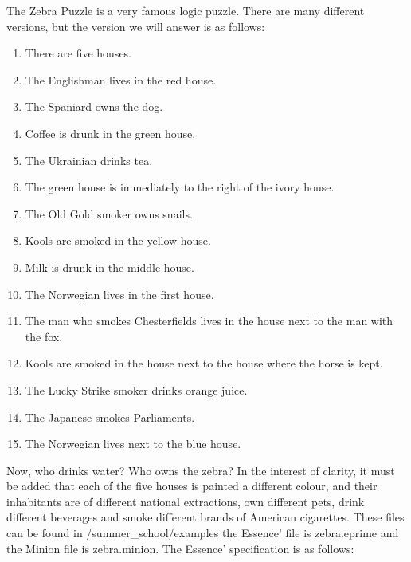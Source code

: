 \documentclass[oneside]{book}
\begin{document}
The Zebra Puzzle is a very famous logic puzzle. There are many different versions, but the version we will answer is as follows:
\begin{enumerate}
\item There are five houses.
\item The Englishman lives in the red house.
\item The Spaniard owns the dog.
\item Coffee is drunk in the green house.
\item The Ukrainian drinks tea.
\item The green house is immediately to the right of the ivory house.
\item The Old Gold smoker owns snails.
\item Kools are smoked in the yellow house.
\item Milk is drunk in the middle house.
\item The Norwegian lives in the first house.
\item The man who smokes Chesterfields lives in the house next to the man with the fox.
\item Kools are smoked in the house next to the house where the horse is kept.
\item The Lucky Strike smoker drinks orange juice.
\item The Japanese smokes Parliaments.
\item The Norwegian lives next to the blue house.
\end{enumerate}
Now, who drinks water? Who owns the zebra? In the interest of clarity, it must
be added that each of the five houses is painted a different colour, and their inhabitants are of different national extractions, own different pets, drink different beverages and smoke different brands of American cigarettes.  These files can be found in /summer\_school/examples the Essence' file is zebra.eprime and the Minion file is zebra.minion. The Essence' specification is as follows:
\end{document}
